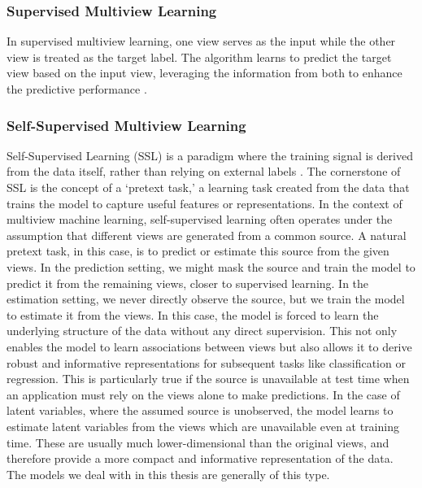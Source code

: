 \subsubsection{Supervised Multiview Learning}

In supervised multiview learning, one view serves as the input while the other view is treated as the target label.
The algorithm learns to predict the target view based on the input view, leveraging the information from both to enhance the predictive performance \citep{zong2023self}.

\subsubsection{Self-Supervised Multiview Learning}

Self-Supervised Learning (SSL) is a paradigm where the training signal is derived from the data itself, rather than relying on external labels \citep{balestriero2023cookbook}.
The cornerstone of SSL is the concept of a `pretext task,' a learning task created from the data that trains the model to capture useful features or representations.
In the context of multiview machine learning, self-supervised learning often operates under the assumption that different \gls{views} are generated from a common source.
A natural pretext task, in this case, is to predict or estimate this source from the given \gls{views}.
In the prediction setting, we might mask the source and train the model to predict it from the remaining \gls{views}, closer to supervised learning.
In the estimation setting, we never directly observe the source, but we train the model to estimate it from the \gls{views}.
In this case, the model is forced to learn the underlying structure of the data without any direct supervision.
This not only enables the model to learn associations between \gls{views} but also allows it to derive robust and informative representations for subsequent tasks like classification or regression.
This is particularly true if the source is unavailable at test time when an application must rely on the \gls{views} alone to make predictions.
In the case of latent variables, where the assumed source is unobserved, the model learns to estimate latent variables from the \gls{views} which are unavailable even at training time.
These are usually much lower-dimensional than the original \gls{views}, and therefore provide a more compact and informative representation of the data.
The models we deal with in this thesis are generally of this type.

